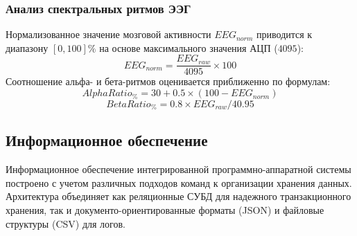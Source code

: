 \documentclass[utf8, russian]{eskdtext}
\begin{document}
\subsubsection{Анализ спектральных ритмов ЭЭГ}
Нормализованное значение мозговой активности $EEG_{norm}$ приводится к диапазону $[0, 100]\%$ на основе максимального значения АЦП ($4095$):
\begin{equation}
    EEG_{norm} = \frac{EEG_{raw}}{4095} \times 100
\end{equation}
Соотношение альфа- и бета-ритмов оценивается приближенно по формулам:
\begin{equation}
    AlphaRatio_{\%} = 30 + 0.5 \times (100 - EEG_{norm})
\end{equation}
\begin{equation}
    BetaRatio_{\%} = 0.8 \times EEG_{raw} / 40.95
\end{equation}

\subsection{Информационное обеспечение}

Информационное обеспечение интегрированной программно-аппаратной системы построено с учетом различных подходов команд к организации хранения данных. Архитектура объединяет как реляционные СУБД для надежного транзакционного хранения, так и документо-ориентированные форматы (JSON) и файловые структуры (CSV) для логов.
\end{document}
